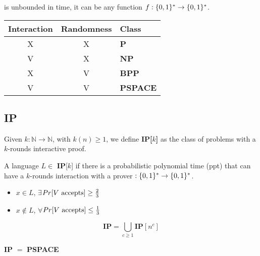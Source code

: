     \prover is unbounded in time, it can be any function $f : \{ 0,1 \}^* \rightarrow \{ 0,1 \}^*$.

    \begin{table}[h]
        \centering
        \begin{tabular}{|c|c|l|}
        \hline
        \multicolumn{1}{|l|}{Interaction} & \multicolumn{1}{l|}{Randomness} & Class           \\ \hline
        X                                 & X                               & \textbf{P}      \\ \hline
        V                                 & X                               & \textbf{NP}     \\ \hline
        X                                 & V                               & \textbf{BPP}    \\ \hline
        V                                 & V                               & \textbf{PSPACE} \\ \hline
        \end{tabular}
    \end{table}


\def\IP{\textbf{IP}}
\subsection{\IP}\label{subsec:ip}
    Given $k : \mathbb{N} \rightarrow \mathbb{N}$, with $k(n) \geq 1$, we define \textbf{IP[$k$]} as the class of problems with a $k$-rounds interactive proof.

    A language $L \in$ \IP[$k$] if there is a probabilistic polynomial time (ppt) \verifier that can have a $k$-rounds interaction with a prover \prover $: \{ 0,1 \}^* \rightarrow \{ 0,1 \}^*$.
    \begin{itemize}
        \item $x \in L$, $\exists$\prover $Pr[V \text{ accepts}] \geq \frac{2}{3}$
        \item $x \not\in L$, $\forall$\prover $Pr[V \text{ accepts}] \leq \frac{1}{3}$
    \end{itemize}

    \begin{definition}[\IP]\label{def:ip}
        \[ \bm{\IP} = \bigcup_{c \geq 1} \IP[n^c] \]
    \end{definition}

    \begin{theorem}\label{thm:ip_pspace}
        \textbf{IP} $=$ \textbf{PSPACE}
    \end{theorem}

